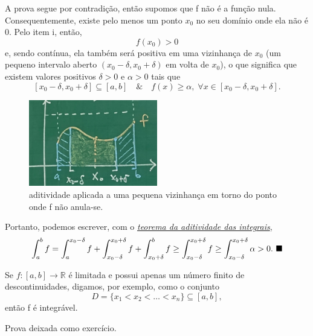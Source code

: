 \documentclass[../analysisII_notes.tex]{subfiles}
\begin{document}
\begin{proof*}
	A prova segue por contradição, então supomos que f não é a função nula. Consequentemente, existe pelo menos um ponto \(x_{0}\) no seu domínio onde ela não é 0. Pelo item i, então,
	\[
		f(x_{0}) > 0
	\]
	e, sendo contínua, ela também será positiva em uma vizinhança de \(x_{0}\) (um pequeno intervalo aberto \((x_{0}-\delta , x_{0}+\delta )\) em volta de \(x_{0}\)), o que significa que existem valores positivos \(\delta > 0\) e \(\alpha > 0\) tais que
	\[
		[x_{0}-\delta , x_{0}+\delta ]\subseteq [a, b] \quad\&\quad f(x)\geq \alpha,\; \forall x\in [x_{0}-\delta , x_{0}+\delta].
	\]

	\begin{figure}[H]
		\begin{center}
			\includegraphics[height=0.5\textheight, width=0.5\textwidth, keepaspectratio]{./Images/neighborhood_10.png}
		\end{center}
		\caption{aditividade aplicada a uma pequena vizinhança em torno do ponto onde f não anula-se.}
		\label{nghbd10}
	\end{figure}
	Portanto, podemos escrever, com o \hyperlink{integral_additivity}{\textit{teorema da aditividade das integrais}},
	\[
		\int_{a}^{b} f = \int_{a}^{x_{0}-\delta }f + \int_{x_{0}-\delta }^{x_{0}+\delta }f + \int_{x_{0}+\delta }^{b}f \geq \int_{x_{0}-\delta }^{x_{0}+\delta }f\geq \int_{x_{0}-\delta }^{x_{0}+\delta } \alpha >0. \text{ $\blacksquare$}
	\]
\end{proof*}
\begin{theorem*}
	Se \(f:[a, b]\rightarrow \mathbb{R}\) é limitada e possui apenas um número finito de descontinuidades, digamos, por exemplo, como o conjunto
	\[
		D = \{x_1 < x_2 < \dotsc < x_{n}\}\subseteq [a, b],
	\]
	então f é integrável.
\end{theorem*}
\begin{exr}
	Prova deixada como exercício.
\end{exr}
\end{document}
